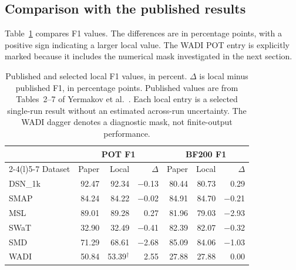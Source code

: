 \subsection{Comparison with the published results}
Table~\ref{tab:replication-f1} compares F1 values. The differences are in
percentage points, with a positive sign indicating a larger local value.
The WADI \ac{POT} entry is explicitly marked because it includes the
numerical mask investigated in the next section.

\begin{table}[htbp]
  \centering
  \small
  \setlength{\tabcolsep}{7pt}
  \begin{tabular}{@{}lrrrrrr@{}}
    \toprule
    & \multicolumn{3}{c}{\acs{POT} F1} & \multicolumn{3}{c}{BF200 F1} \\
    \cmidrule(lr){2-4}\cmidrule(l){5-7}
    Dataset & Paper & Local & \(\Delta\) & Paper & Local & \(\Delta\) \\
    \midrule
    DSN\_1k & \num{92.47} & \num{92.34} & \num{-0.13} & \num{80.44} & \num{80.73} & \num{+0.29} \\
    \acs{SMAP} & \num{84.24} & \num{84.22} & \num{-0.02} & \num{84.91} & \num{84.70} & \num{-0.21} \\
    \acs{MSL} & \num{89.01} & \num{89.28} & \num{+0.27} & \num{81.96} & \num{79.03} & \num{-2.93} \\
    SWaT & \num{32.90} & \num{32.49} & \num{-0.41} & \num{82.39} & \num{82.07} & \num{-0.32} \\
    \acs{SMD} & \num{71.29} & \num{68.61} & \num{-2.68} & \num{85.09} & \num{84.06} & \num{-1.03} \\
    WADI & \num{50.84} & \num{53.39}\(^{\dagger}\) & \num{+2.55} & \num{27.88} & \num{27.88} & \num{0.00} \\
    \bottomrule
  \end{tabular}
  \caption{Published and selected local F1 values, in percent.
  \(\Delta\) is local minus published F1, in percentage points.
  Published values are from Tables~\num{2}--\num{7} of
  Yermakov et al.~\cite{Yermakov2025TranADPlus}. Each local entry is a
  selected single-run result without an estimated across-run uncertainty.
  The WADI dagger denotes a diagnostic mask, not finite-output performance.}
  \label{tab:replication-f1}
\end{table}

